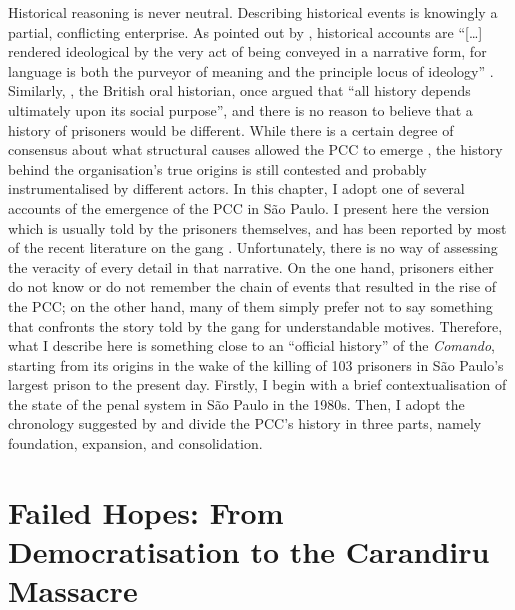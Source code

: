 Historical reasoning is never neutral. Describing historical events is knowingly a partial, conflicting enterprise. As pointed out by \citet[401]{istiaisyah2001textual}, historical accounts are ``[\dots] rendered ideological by the very act of being conveyed in a narrative form, for language is both the purveyor of meaning and the principle locus of ideology'' \citep[401]{istiaisyah2001textual}. Similarly, \citet[1]{thompson2000voice}, the British oral historian, once argued that ``all history depends ultimately upon its social purpose'', and there is no reason to believe that a history of prisoners would be different. While there is a certain degree of consensus about what structural causes allowed the PCC to emerge \citep[]{adorno1991sistema, cruz2013recent, redigolo2012sistema, salla2007montoro}, the history behind the organisation's true origins is still contested and probably instrumentalised by different actors. In this chapter, I adopt one of several accounts of the emergence of the PCC in S\~{a}o Paulo. I present here the version which is usually told by the prisoners themselves, and has been reported by most of the recent literature on the gang \citep[]{amorim2003cv, biondi2010junto, dias2011pulverizaccao, jozino2004cobras, souza2007pcc}. Unfortunately, there is no way of assessing the veracity of every detail in that narrative. On the one hand, prisoners either do not know or do not remember the chain of events that resulted in the rise of the PCC; on the other hand, many of them simply prefer not to say something that confronts the story told by the gang for understandable motives. Therefore, what I describe here is something close to an ``official history'' of the \textit{Comando}, starting from its origins in the wake of the killing of 103 prisoners in S\~{a}o Paulo's largest prison to the present day. Firstly, I begin with a brief contextualisation of the state of the penal system in S\~{a}o Paulo in the 1980s. Then, I adopt the chronology suggested by \citet{dias2011pulverizaccao} and divide the PCC's history in three parts, namely foundation, expansion, and consolidation.

\section{Failed Hopes: From Democratisation to the Carandiru Massacre}


